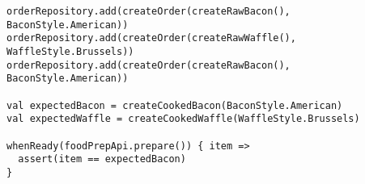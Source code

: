 \documentclass[a4paper,11pt]{article}
\begin{document}
\begin{lstlisting}[style=scala]
orderRepository.add(createOrder(createRawBacon(), BaconStyle.American))
orderRepository.add(createOrder(createRawWaffle(), WaffleStyle.Brussels))
orderRepository.add(createOrder(createRawBacon(), BaconStyle.American))

val expectedBacon = createCookedBacon(BaconStyle.American)
val expectedWaffle = createCookedWaffle(WaffleStyle.Brussels)

whenReady(foodPrepApi.prepare()) { item =>
  assert(item == expectedBacon)
}
\end{lstlisting}




\end{document}
